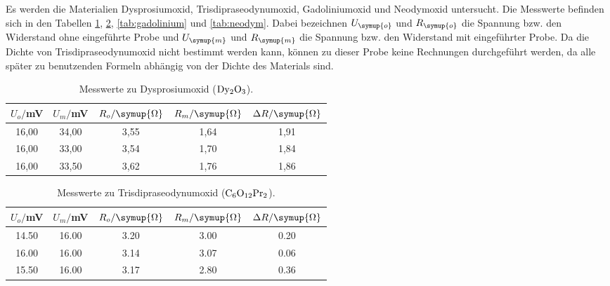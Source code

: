 Es werden die Materialien Dysprosiumoxid, Trisdipraseodynumoxid, Gadoliniumoxid und
Neodymoxid untersucht. Die Messwerte befinden sich in den Tabellen \ref{tab:dysprosium},
\ref{tab:seodynumoxid}, \ref{tab:gadolinium} und \ref{tab:neodym}. Dabei bezeichnen
$U_{\symup{o}}$ und $R_{\symup{o}}$ die Spannung bzw. den Widerstand ohne eingeführte
Probe und $U_{\symup{m}}$ und $R_{\symup{m}}$ die Spannung bzw. den Widerstand mit
eingeführter Probe. Da die Dichte von Trisdipraseodynumoxid nicht bestimmt werden
kann, können zu dieser Probe keine Rechnungen durchgeführt werden, da alle später
zu benutzenden Formeln abhängig von der Dichte des Materials sind.


\begin{table}[htp]
	\begin{center}
    \caption{Messwerte zu Dysprosiumoxid ($\ce{Dy2O3}$).}
    \label{tab:dysprosium}
		\begin{tabular}{ccccc}
		\toprule
			{$U_o/$mV} & {$U_m/$mV} & {$R_o/\symup{\Omega}$} & {$R_m/\symup{\Omega}$} & {$\Delta R/\symup{\Omega}$}\\
			\midrule
			16,00 & 34,00 & 3,55 & 1,64 & 1,91\\
			16,00 & 33,00 & 3,54 & 1,70 & 1,84\\
			16,00 & 33,50 & 3,62 & 1,76 & 1,86\\
		\bottomrule
		\end{tabular}
	\end{center}
\end{table}


\begin{table}[htp]
	\begin{center}
    \caption{Messwerte zu Trisdipraseodynumoxid ($\ce{C6O12Pr2}$).}
    \label{tab:seodynumoxid}
		\begin{tabular}{ccccc}
		\toprule
			{$U_o/$mV} & {$U_m/$mV} & {$R_o/\symup{\Omega}$} & {$R_m/\symup{\Omega}$} & {$\Delta R/\symup{\Omega}$}\\
			\midrule
			14.50 & 16.00 & 3.20 & 3.00 & 0.20\\
			16.00 & 16.00 & 3.14 & 3.07 & 0.06\\
			15.50 & 16.00 & 3.17 & 2.80 & 0.36\\
		\bottomrule
		\end{tabular}
	\end{center}
\end{table}



